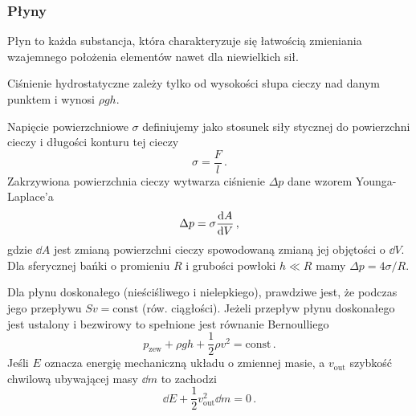 \documentclass[../main.tex]{subfiles}
\begin{document}
\subsubsection{Płyny}
Płyn to każda substancja, która charakteryzuje się łatwością zmieniania wzajemnego położenia elementów nawet dla niewielkich sił.
\medskip

\noindent{}
\medskip

\noindent{}
\medskip

Ciśnienie hydrostatyczne zależy tylko od wysokości słupa cieczy nad danym punktem i wynosi \(\rho gh\).
\medskip

Napięcie powierzchniowe \(\sigma\) definiujemy jako stosunek siły stycznej do powierzchni cieczy i długości konturu tej cieczy
\begin{equation*}
    \sigma=\frac{F}{l}\,.
\end{equation*}
Zakrzywiona powierzchnia cieczy wytwarza ciśnienie \(\Delta p\) dane wzorem Younga-Laplace'a
\begin{equation*}
    \Delta p=\sigma \dv{A}{V}\,,
\end{equation*}
gdzie \(\dd{A}\) jest zmianą powierzchni cieczy spowodowaną zmianą jej objętości o \(\dd{V}\). Dla sferycznej bańki o promieniu \(R\) i grubości powłoki \(h\ll R\) mamy \(\Delta p=4\sigma/R\).
\medskip

Dla płynu doskonałego (nieściśliwego i nielepkiego), prawdziwe jest, że podczas jego przepływu \(Sv=\text{const}\) (rów. ciągłości). Jeżeli przepływ płynu doskonałego jest ustalony i bezwirowy to spełnione jest równanie Bernoulliego
\begin{equation*}
    p_\text{zew}+\rho gh+\frac{1}{2}\rho v^2=\text{const}\,.
\end{equation*}
Jeśli \(E\) oznacza energię mechaniczną układu o zmiennej masie, a \(v_\text{out}\) szybkość chwilową ubywającej masy \(\dd{m}\) to zachodzi
\begin{equation*}
    \dd{E}+\frac{1}{2}v_\text{out}^2\dd{m}=0\,.
\end{equation*}
\end{document}
